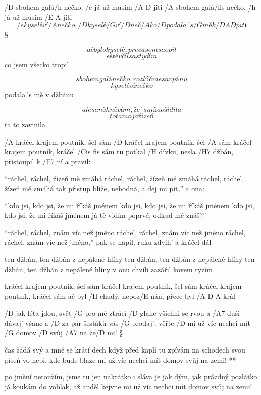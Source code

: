 /D sbohem galá/h nečko, /e já už musím /{A D} jíti
/A sbohem galá/fis nečko, /h já už musím /{E A} jíti
\[ /e kyselé ví/A nečko, /D kyselé /G ví/D neč/A ko
/D podala´s /G mě k /{D A D} pití \]\S

\[ ač bylo kyselé, preca som sa opil \]
\[ eště včíl sa stydím \]
co jsem všecko tropil \s

\[ sbohem galánečko, rozlúčme sa v pánu \]
\[ kyselé vínečko \]
podala´s mě v džbánu \s

\[ ale sa něhněvám, že´s mňa ošidila \]
\[ to ta moja žízeň \]
ta to zavinila




/A kráčel krajem poutník, šel sám
/D kráčel krajem poutník, šel /A sám
kráčel krajem poutník, kráčel /{Cis fis} sám
tu potkal /H dívku, nesla /H7 džbán, přistoupil k /E7 ní a pravil: \s

``ráchel, ráchel, žízeň mě zmáhá
ráchel, ráchel, žízeň mě zmáhá
ráchel, ráchel, žízeň mě zmáhá
tak přistup blíže, nehodná, a dej mi pít,'' a ona: \s

``kdo jsi, kdo jsi, že mi říkáš jménem
kdo jsi, kdo jsi, že mi říkáš jménem
kdo jsi, kdo jsi, že mi říkáš jménem
já tě vidím poprvé, odkud mě znáš?'' \s

``ráchel, ráchel, znám víc než jméno
ráchel, ráchel, znám víc než jméno
ráchel, ráchel, znám víc než jméno,''
pak se napil, ruku zdvih' a kráčel dál \s

ten džbán, ten džbán z nepálené hlíny
ten džbán, ten džbán z nepálené hlíny
ten džbán, ten džbán z nepálené hlíny
v onu chvíli zazářil kovem ryzím \s

kráčel krajem poutník, šel sám
kráčel krajem poutník, šel sám
kráčel krajem poutník, kráčel sám
ač byl /H chudý, nepoz/E nán, přece byl /{A D A} král




/D jak léta jdou, svět /G pro mě ztrácí /D glanc
všichni se rvou a /A7 duši dávaj' všanc
a /D za pár šestáků vás /G prodaj', věřte /D mi
už víc nechci mít /G domov /D svůj /A7 na ze/D mi! \S

\R  čas žádá svý a mně se krátí dech
    když před kaplí tu zpívám na schodech
    svou píseň vo nebi, kde bude blaze mi
    už víc nechci mít domov svůj na zemi! **

po jmění netoužím, jsme tu jen nakrátko
i sláva je jak dým, jak prázdný pozlátko
já koukám do voblak, až anděl kejvne mi
už víc nechci mít domov svůj na zemi!

